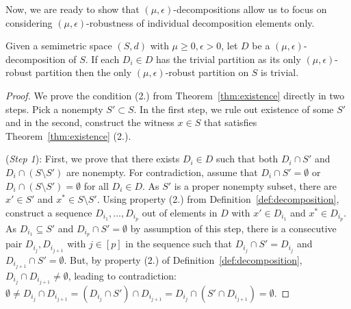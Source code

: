 Now, we are ready to show that $(\mu, \epsilon)$-decompositions allow us to focus on considering $(\mu, \epsilon)$-robustness of individual decomposition elements only.

\begin{theorem}
\label{thm:decomposition}
    Given a semimetric space $(S, d)$ with $\mu \geq 0, \epsilon > 0$, let $D$ be a $(\mu, \epsilon)$-decomposition of $S$. If each $D_i \in D$ has the trivial partition as its only $(\mu, \epsilon)$-robust partition then the only $(\mu, \epsilon)$-robust partition on $S$ is trivial.
\end{theorem}
\begin{proof}   
    We prove the condition (2.) from Theorem~\ref{thm:existence} directly in two steps. Pick a nonempty $S' \subset S$. In the first step, we rule out existence of some $S'$ and in the second, construct the witness $x \in S$ that satisfies Theorem~\ref{thm:existence} (2.).
    
    (\emph{Step 1}): 
    First, we prove that there exists $D_i \in D$ such that both $D_i \cap S'$ and $D_i \cap (S \setminus S')$ are nonempty. For contradiction, assume that $D_i \cap S' = \emptyset$ or $D_i \cap (S \setminus S') = \emptyset$ for all $D_i \in D$. As $S'$ is a proper nonempty subset, there are $x' \in S'$ and $x^* \in S \setminus S'$. Using property (2.) from Definition~\ref{def:decomposition}, construct a sequence $D_{i_1}, \dots, D_{i_p}$ out of elements in $D$ with $x' \in D_{i_1}$ and $x^* \in D_{i_p}$. As $D_{i_1} \subseteq S'$ and $D_{i_p} \cap S' = \emptyset$ by assumption of this step, there is a consecutive pair $D_{i_j}, D_{i_{j + 1}}$  with $j \in [p]$ in the sequence such that $D_{i_j} \cap S' = D_{i_j}$ and $D_{i_{j + 1}} \cap S' = \emptyset$. But, by property (2.) of Definition~\ref{def:decomposition}, $D_{i_j} \cap D_{i_{j + 1}} \neq \emptyset$, leading to contradiction: $\emptyset \neq D_{i_j} \cap D_{i_{j + 1}} = (D_{i_j} \cap S') \cap D_{i_{j + 1}} = D_{i_j} \cap (S' \cap D_{i_{j + 1}}) = \emptyset$.


\end{proof}
